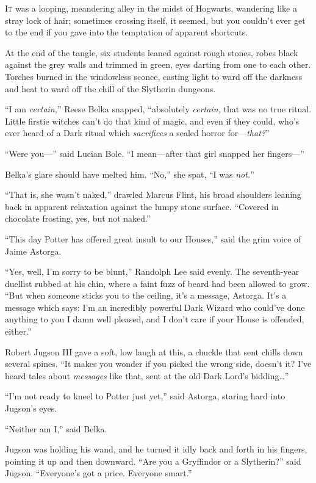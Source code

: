 
\lettrine{I}{t} was a looping, meandering alley in the midst of Hogwarts, wandering like a stray lock of hair; sometimes crossing itself, it seemed, but you couldn’t ever get to the end if you gave into the temptation of apparent shortcuts.

At the end of the tangle, six students leaned against rough stones, robes black against the grey walls and trimmed in green, eyes darting from one to each other. Torches burned in the windowless sconce, casting light to ward off the darkness and heat to ward off the chill of the Slytherin dungeons.

“I am \emph{certain,}” Reese Belka snapped, “absolutely \emph{certain,} that was no true ritual. Little firstie witches can’t do that kind of magic, and even if they could, who’s ever heard of a Dark ritual which \emph{sacrifices} a sealed horror for—\emph{that?}”

“Were you—” said Lucian Bole. “I mean—after that girl snapped her fingers—”

Belka’s glare should have melted him. “No,” she spat, “I was \emph{not.}”

“That is, she wasn’t naked,” drawled Marcus Flint, his broad shoulders leaning back in apparent relaxation against the lumpy stone surface. “Covered in chocolate frosting, yes, but not naked.”

“This day Potter has offered great insult to our Houses,” said the grim voice of Jaime Astorga.

“Yes, well, I’m sorry to be blunt,” Randolph Lee said evenly. The seventh-year duellist rubbed at his chin, where a faint fuzz of beard had been allowed to grow. “But when someone sticks you to the ceiling, it’s a message, Astorga. It’s a message which says: I’m an incredibly powerful Dark Wizard who could’ve done anything to you I damn well pleased, and I don’t care if your House is offended, either.”

Robert Jugson III gave a soft, low laugh at this, a chuckle that sent chills down several spines. “It makes you wonder if you picked the wrong side, doesn’t it? I’ve heard tales about \emph{messages} like that, sent at the old Dark Lord’s bidding…”

“I’m not ready to kneel to Potter just yet,” said Astorga, staring hard into Jugson’s eyes.

“Neither am I,” said Belka.

Jugson was holding his wand, and he turned it idly back and forth in his fingers, pointing it up and then downward. “Are you a Gryffindor or a Slytherin?” said Jugson. “Everyone’s got a price. Everyone smart.”

